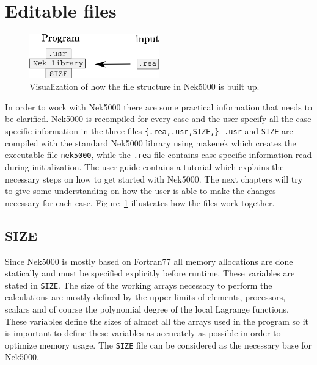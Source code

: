\section{Editable files}
%
\begin{figure}[h]
	\centering
	\includegraphics[width=0.5\textwidth]{Figures/filestructure2.png}
	\caption{Visualization of how the file structure in Nek5000 is built up.}
	\label{fig:files}
\end{figure}
%
In order to work with Nek5000 there are some practical information that needs to be clarified.
Nek5000 is recompiled for every case and the user specify all the case specific 
information in the three files \verb|{.rea,.usr,SIZE,}|. \verb|.usr| and \verb|SIZE| are 
compiled with the standard Nek5000 library using makenek which creates the executable file \verb|nek5000|,
while the \verb|.rea| file contains case-specific information read during initialization.
The user guide \cite{Nek} contains a tutorial which explains the necessary 
steps on how to get started with Nek5000. The next chapters will try to give some understanding on 
how the user is able to make the changes necessary for each case. Figure~\ref{fig:files} illustrates 
how the files work together. 
%
\subsection{SIZE}
Since Nek5000 is mostly based on Fortran77 all memory allocations are done statically and must be specified explicitly 
before runtime. These variables are stated in \verb|SIZE|. The size of the working arrays 
necessary to perform the calculations are mostly defined by the upper limits of elements, 
processors, scalars and of course the polynomial degree
of the local Lagrange functions. These variables define the sizes of almost all 
the arrays used in the program so it is important to define these variables as accurately 
as possible in order to optimize memory usage. The \verb|SIZE| file can be considered as the necessary base 
for Nek5000.
